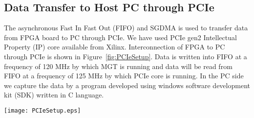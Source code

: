 \documentclass[10pt, conference, compsocconf]{IEEEtran}
\begin{document}
\subsection{Data Transfer to Host PC through PCIe}
The asynchronous Fast In Fast Out (FIFO) and SGDMA is used to transfer data from FPGA board to PC through PCIe. We have used PCIe gen2 Intellectual Property (IP) core available from Xilinx. Interconnection of FPGA to PC through PCIe is shown in Figure~\ref{fig:PCIeSetup}. Data is written into FIFO at a frequency of 120 MHz by which MGT is running and  data will be read from FIFO at a frequency of 125 MHz by which PCIe core is running. In the PC side we capture the data by a program developed using windows software development kit (SDK) written in C language.  
\begin{figure*}[htb]
\centering
\texttt{[image: PCIeSetup.eps]}
\vspace{-5 pt}
\caption{ PCIe interfacing with blocks and Experimental setup of proposed DAQ}
\label{fig:PCIeSetup}

\end{figure*}
\end{document}
